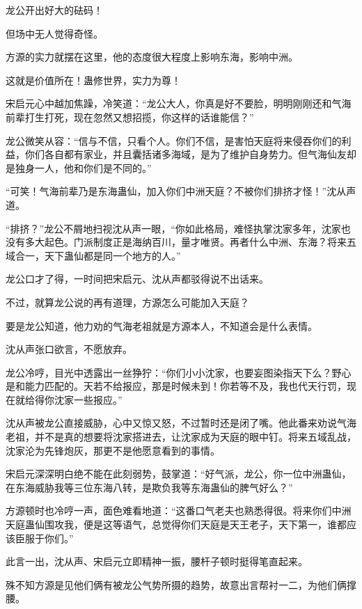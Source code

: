
\begin{this_body}

龙公开出好大的砝码！

但场中无人觉得奇怪。

方源的实力就摆在这里，他的态度很大程度上影响东海，影响中洲。

这就是价值所在！蛊修世界，实力为尊！

宋启元心中越加焦躁，冷笑道：“龙公大人，你真是好不要脸，明明刚刚还和气海前辈打生打死，现在忽然又想招揽，你这样的话谁能信？”

龙公微笑从容：“信与不信，只看个人。你们不信，是害怕天庭将来侵吞你们的利益，你们各自都有家业，并且囊括诸多海域，是为了维护自身势力。但气海仙友却是独身一人，他和你们是不同的。”

“可笑！气海前辈乃是东海蛊仙，加入你们中洲天庭？不被你们排挤才怪！”沈从声道。

“排挤？”龙公不屑地扫视沈从声一眼，“你如此格局，难怪执掌沈家多年，沈家也没有多大起色。门派制度正是海纳百川，量才唯贤。再者什么中洲、东海？将来五域合一，天下蛊仙都是同一个地方的人。”

龙公口才了得，一时间把宋启元、沈从声都驳得说不出话来。

不过，就算龙公说的再有道理，方源怎么可能加入天庭？

要是龙公知道，他力劝的气海老祖就是方源本人，不知道会是什么表情。

沈从声张口欲言，不愿放弃。

龙公冷哼，目光中透露出一丝狰狞：“你们小小沈家，也要妄图染指天下么？野心是和能力匹配的。天若不给报应，那是时候未到！你若等不及，我也代天行罚，现在就给得你沈家一些报应。”

沈从声被龙公直接威胁，心中又惊又怒，不过暂时还是闭了嘴。他此番来劝说气海老祖，并不是真的想要将沈家搭进去，让沈家成为天庭的眼中钉。将来五域乱战，沈家沦为先锋炮灰，那更不是他愿意看到的事情。

宋启元深深明白绝不能在此刻弱势，鼓掌道：“好气派，龙公，你一位中洲蛊仙，在东海威胁我等三位东海八转，是欺负我等东海蛊仙的脾气好么？”

方源顿时也冷哼一声，面色难看地道：“这番口气老夫也熟悉得很。将来你们中洲天庭蛊仙围攻我，便是这等语气，总觉得你们天庭是天王老子，天下第一，谁都应该臣服于你们。”

此言一出，沈从声、宋启元立即精神一振，腰杆子顿时挺得笔直起来。

殊不知方源是见他们俩有被龙公气势所摄的趋势，故意出言帮衬一二，为他们俩撑腰。


\end{this_body}
